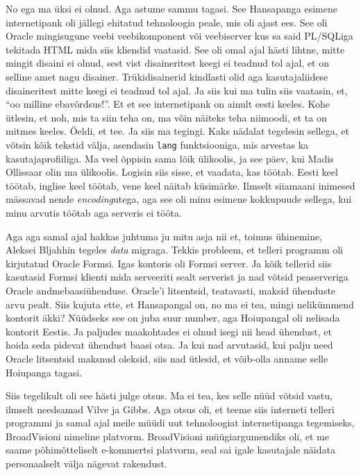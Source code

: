 No ega ma üksi ei olnud. Aga astume sammu tagasi. See Hansapanga esimene 
internetipank oli jällegi ehitatud tehnoloogia peale, mis oli ajast ees. See 
oli Oracle mingisugune veebi veebikomponent või veebiserver kus 
sa said PL/SQLiga tekitada HTML mida siis kliendid 
vaatasid. See oli omal ajal hästi lihtne, mitte mingit disaini ei olnud, sest 
vist disaineritest keegi ei teadnud tol ajal, et on selline amet nagu disainer. 
Trükidisainerid kindlasti olid aga kasutajaliidese disaineritest mitte keegi ei 
teadnud tol ajal. Ja siis kui ma tulin siis vaatasin, et, \enquote{oo milline 
ebavõrdsus!}. Et et see internetipank on ainult eesti keeles. Kohe ütlesin, et 
noh, mis ta siin teha on, ma võin näiteks teha niimoodi, et ta on 
mitmes keeles. Öeldi, et tee. Ja siis ma tegingi. Kaks nädalat tegelesin 
sellega, et võtsin kõik tekstid välja, asendasin \verb|lang| funktsiooniga, mis 
arvestas ka kasutajaprofiiliga. Ma veel õppisin sama lõik ülikoolis, ja see 
päev, kui Madis Ollissaar olin ma ülikoolis. 
Logisin siis sisse, et vaadata, kas töötab. Eesti keel töötab, inglise keel 
töötab, vene keel näitab küsimärke. Ilmselt siiamaani inimesed mässavad nende 
\emph{encoding}utega, aga see oli minu esimene kokkupuude sellega, kui minu 
arvutis töötab aga serveris ei tööta.

Aga aga samal ajal hakkas juhtuma ju mitu asja nii et, toimus ühinemine, 
Aleksei Bljahhin tegeles \emph{data} migraga. 
Tekkis probleem, et telleri programm oli kirjutatud Oracle Formsi. Igas 
kontoris oli Formsi server. Ja kõik tellerid siis kasutasid Formsi klienti mida 
serveeriti sealt serverist ja nad võtsid peaserveriga Oracle 
andmebaasiühenduse. Oracle'i litsentsid, teatavasti, maksid ühenduste arvu 
pealt. Siis kujuta ette, et Hansapangal on, no ma ei tea, mingi nelikümmend 
kontorit äkki? Nüüdseks see on juba suur number, aga Hoiupangal oli nelisada 
kontorit Eestis. Ja paljudes maakohtades ei olnud isegi nii head ühendust, et 
hoida seda pidevat ühendust baasi otsa. Ja kui nad arvutasid, kui palju need 
Oracle litsentsid maksnud oleksid, siis nad ütlesid, et võib-olla anname selle
Hoiupanga tagasi. 

Siis tegelikult oli see hästi julge otsus. Ma ei tea, kes selle nüüd võtsid 
vastu, ilmselt needsamad Vilve ja 
Gibbs. Aga otsus oli, et teeme siis 
interneti telleri programmi ja samal ajal meile müüdi uut tehnoloogiat 
internetipanga tegemiseks, BroadVisioni nimeline platvorm. 
BroadVisioni müügiargumendiks oli, et me saame põhimõtteliselt e-kommertsi 
platvorm,  seal sai igale kasutajale näidata personaalselt välja nägevat 
rakendust.


